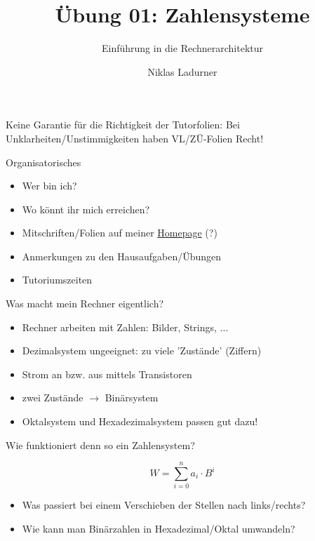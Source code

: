 \documentclass[
  german,            %
  aspectratio=169,    %
]{tumbeamer}
\title{Übung 01: Zahlensysteme}
\subtitle{Einführung in die Rechnerarchitektur}
\author{Niklas Ladurner}
\institute{\theChairName\\\theDepartmentName\\\theUniversityName}
\date{\DTMdisplaydate{2023}{10}{20}{-1}}
\begin{document}
\maketitle

\begin{frame}[c]{}{}
  \begin{center}
    \LARGE  Keine Garantie für die Richtigkeit der Tutorfolien: Bei Unklarheiten/Unstimmigkeiten 
    haben VL/ZÜ-Folien Recht!
  \end{center}
\end{frame}

\begin{frame}[c]{Organisatorisches}{}
  \begin{itemize}
    \item Wer bin ich?
    \item Wo könnt ihr mich erreichen?
    \item Mitschriften/Folien auf meiner \href{https://home.in.tum.de/~ladu/}{Homepage} (?) 
    \item Anmerkungen zu den Hausaufgaben/Übungen
    \item Tutoriumszeiten
  \end{itemize}
\end{frame}

\begin{frame}[c]{Was macht mein Rechner eigentlich?}{}
    \begin{itemize}
      \item Rechner arbeiten mit Zahlen: Bilder, Strings, ...
      \item Dezimalsystem ungeeignet: zu viele 'Zustände' (Ziffern)
      \item Strom an bzw. aus mittels Transistoren
      \item zwei Zustände $\rightarrow$ Binärsystem
      \item Oktalsystem und Hexadezimalsystem passen gut dazu!
    \end{itemize}
  \end{frame}

  \begin{frame}[c]{Wie funktioniert denn so ein Zahlensystem?}{}
      \begin{center}
        \LARGE $$W=\sum_{i=0}^na_i\cdot B^i$$
      \end{center}
      \hspace{1cm}
      \begin{itemize}
        \item Was passiert bei einem Verschieben der Stellen nach links/rechts?
        \item Wie kann man Binärzahlen in Hexadezimal/Oktal umwandeln?
      \end{itemize}
  \end{frame}
\end{document}
